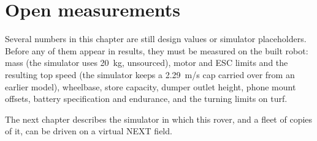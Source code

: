 \section{Open measurements}
\label{sec:rover-open}

Several numbers in this chapter are still design values or simulator placeholders.
Before any of them appear in results, they must be measured on the built robot:
mass (the simulator uses 20~kg, unsourced), motor and ESC limits and the resulting top speed (the simulator keeps a 2.29~m/s cap carried over from an earlier model), wheelbase, store capacity, dumper outlet height, phone mount offsets, battery specification and endurance, and the turning limits on turf.

The next chapter describes the simulator in which this rover, and a fleet of copies of it, can be driven on a virtual NEXT field.
